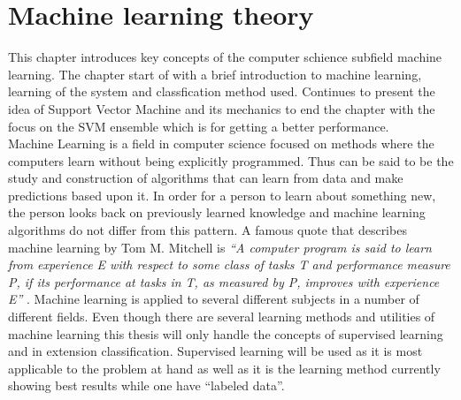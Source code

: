 \chapter{Machine learning theory}
\label{chapter:mltheory}

This chapter introduces key concepts of the computer schience subfield machine learning. The chapter start of with a brief introduction to machine learning, learning of the system and classfication method used. Continues to present the idea of Support Vector Machine and its mechanics to end the chapter with the focus on the SVM ensemble which is for getting a better performance. \\


Machine Learning is a field in computer science focused on methods where the computers learn without being explicitly programmed. Thus can be said to be the study and construction of algorithms that can learn from data and make predictions based upon it. In order for a person to learn about something new, the person looks back on previously learned knowledge and machine learning algorithms do not differ from this pattern. A famous quote that describes machine learning by Tom M. Mitchell is \textit{``A computer program is said to learn from experience E with respect to some class of tasks T and performance measure P, if its performance at tasks in T, as measured by P, improves with experience E''} \cite{Mitchell:1997:ML:541177}. 
Machine learning is applied to several different subjects in a number of different fields. Even though there are several learning methods and utilities of machine learning this thesis will only handle the concepts of supervised learning and in extension classification. Supervised learning will be used as it is most applicable  to the problem at hand as well as it is the learning method currently showing best results while one have ``labeled data''.

